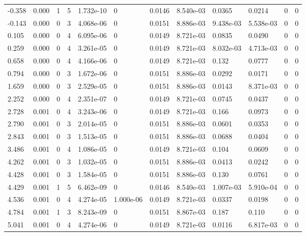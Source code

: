 \documentclass[preview]{standalone}
\begin{document}
{{\begin{tabular}{L{1.2cm}C{1.2cm} C{0.3cm}C{0.5cm} C{1.4cm}C{1.4cm} C{1.4cm}C{1.4cm} C{1.6cm}C{1.6cm} C{1.6cm}C{1.6cm}}
  -0.358  &  0.000  & 1     &  5 &  1.732e-10  & 0  &  0.0146&   8.540e-03& 0.0365 & 0.0214   &  0 & 0  \\ 
  -0.143  &  0.000  & 0     &  3 &  4.068e-06  & 0  &  0.0151&   8.886e-03& 9.438e-03 & 5.538e-03   &  0 & 0  \\ 
  0.105  &  0.000  & 0     &  4 &  6.095e-06  & 0  &  0.0149&   8.721e-03& 0.0835 & 0.0490   &  0 & 0  \\ 
  0.259  &  0.000  & 0     &  4 &  3.261e-05  & 0  &  0.0149&   8.721e-03& 8.032e-03 & 4.713e-03   &  0 & 0  \\ 
  0.658  &  0.000  & 0     &  4 &  4.166e-06  & 0  &  0.0149&   8.721e-03& 0.132 & 0.0777   &  0 & 0  \\ 
  0.794  &  0.000  & 0     &  3 &  1.672e-06  & 0  &  0.0151&   8.886e-03& 0.0292 & 0.0171   &  0 & 0  \\ 
  1.659  &  0.000  & 0     &  3 &  2.529e-05  & 0  &  0.0151&   8.886e-03& 0.0143 & 8.371e-03   &  0 & 0  \\ 
  2.252  &  0.000  & 0     &  4 &  2.351e-07  & 0  &  0.0149&   8.721e-03& 0.0745 & 0.0437   &  0 & 0  \\ 
  2.728  &  0.001  & 0     &  4 &  3.243e-06  & 0  &  0.0149&   8.721e-03& 0.166 & 0.0973   &  0 & 0  \\ 
  2.790  &  0.001  & 0     &  3 &  2.014e-05  & 0  &  0.0151&   8.886e-03& 0.0601 & 0.0353   &  0 & 0  \\ 
  2.843  &  0.001  & 0     &  3 &  1.513e-05  & 0  &  0.0151&   8.886e-03& 0.0688 & 0.0404   &  0 & 0  \\ 
  3.486  &  0.001  & 0     &  4 &  1.086e-05  & 0  &  0.0149&   8.721e-03& 0.104 & 0.0609   &  0 & 0  \\ 
  4.262  &  0.001  & 0     &  3 &  1.032e-05  & 0  &  0.0151&   8.886e-03& 0.0413 & 0.0242   &  0 & 0  \\ 
  4.428  &  0.001  & 0     &  3 &  1.584e-05  & 0  &  0.0151&   8.886e-03& 0.130 & 0.0761   &  0 & 0  \\ 
  4.429  &  0.001  & 1     &  5 &  6.462e-09  & 0  &  0.0146&   8.540e-03& 1.007e-03 & 5.910e-04   &  0 & 0  \\ 
  4.536  &  0.001  & 0     &  4 &  4.274e-05  & 1.000e-06  &  0.0149&   8.721e-03& 0.0337 & 0.0198   &  0 & 0  \\ 
  4.784  &  0.001  & 1     &  3 &  8.243e-09  & 0  &  0.0151&   8.867e-03& 0.187 & 0.110   &  0 & 0  \\ 
  5.041  &  0.001  & 0     &  4 &  4.274e-06  & 0  &  0.0149&   8.721e-03& 0.0116 & 6.817e-03   &  0 & 0  \\ 

\end{tabular}}}
\end{document}
